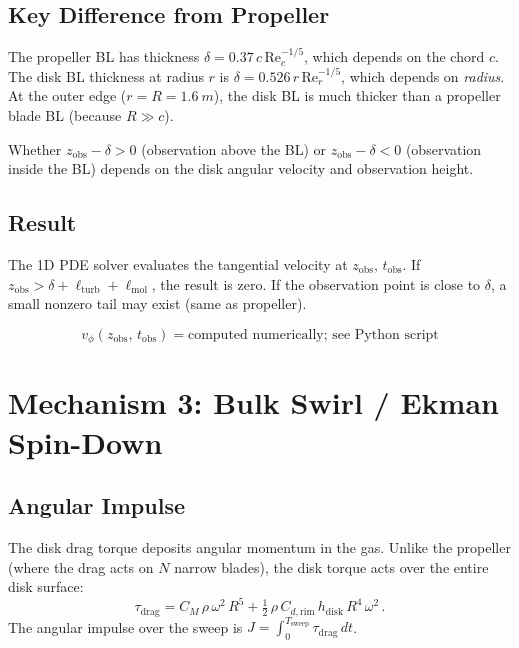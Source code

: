 \documentclass[11pt,a4paper]{article}
\begin{document}
\subsection{Key Difference from Propeller}

The propeller BL has thickness $\delta = 0.37\,c\,\mathrm{Re}_c^{-1/5}$,
which depends on the chord $c$. The disk BL thickness at radius $r$ is
$\delta = 0.526\,r\,\mathrm{Re}_r^{-1/5}$, which depends on \emph{radius}.
At the outer edge ($r = R = \SI{1.6}{m}$), the disk BL is much thicker
than a propeller blade BL (because $R \gg c$).

Whether $z_\mathrm{obs} - \delta > 0$ (observation above the BL) or
$z_\mathrm{obs} - \delta < 0$ (observation inside the BL) depends on
the disk angular velocity and observation height.

\subsection{Result}

The 1D PDE solver evaluates the tangential velocity at $z_\mathrm{obs}$,
$t_\mathrm{obs}$. If $z_\mathrm{obs} > \delta + \ell_\mathrm{turb}
+ \ell_\mathrm{mol}$, the result is zero. If the observation point is
close to $\delta$, a small nonzero tail may exist (same as propeller).

\begin{equation}
  \boxed{v_\phi(z_\mathrm{obs},\, t_\mathrm{obs}) = \text{computed
  numerically; see Python script}}
\end{equation}


\section{Mechanism 3: Bulk Swirl / Ekman Spin-Down}
\label{sec:swirl}

\subsection{Angular Impulse}

The disk drag torque deposits angular momentum in the gas. Unlike the
propeller (where the drag acts on $N$ narrow blades), the disk torque
acts over the entire disk surface:
\begin{equation}
  \tau_\mathrm{drag}
    = C_M\,\rho\,\omega^2\,R^5 + \tfrac{1}{2}\,\rho\,C_{d,\mathrm{rim}}
      \,h_\mathrm{disk}\,R^4\,\omega^2\,.
\end{equation}
The angular impulse over the sweep is $J = \int_0^{T_\mathrm{sweep}}
\tau_\mathrm{drag}\,dt$.
\end{document}
